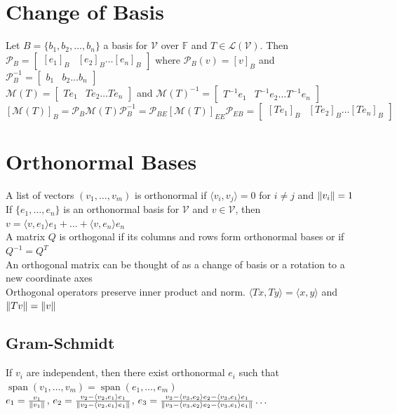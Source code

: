 \documentclass{article}
\DeclarePairedDelimiter\norm{\lVert}{\rVert}%
\DeclareMathOperator{\spans}{span}
\newcommand{\F}{\mathbb{F}}
\newcommand{\linear}{\mathcal{L}}
\newcommand{\PP}{\mathcal{P}}
\newcommand{\M}{\mathcal{M}}
\newcommand{\V}{\mathcal{V}}
\newcommand\inner[2]{\langle #1, #2 \rangle}
\begin{document}
\section{Change of Basis}
Let $B = \{b_1, b_2, ..., b_n\}$ a basis for $\V$ over $\F$ and $T \in \linear(\V)$. Then \\
$\PP_{B} = \begin{bmatrix} [e_1]_B & [e_2]_B  \ldots  [e_n]_B \end{bmatrix}$ where $\PP_{B}(v) = [v]_B$ and $\PP_{B}^{-1} = \begin{bmatrix} b_1 & b_2  \ldots b_n \end{bmatrix}$ \\
$\M(T) = \begin{bmatrix} Te_1 & Te_2  \ldots  Te_n \end{bmatrix}$ and ${\M(T)} ^{-1} = \begin{bmatrix} T^{-1}e_1 & T^{-1}e_2  \ldots  T^{-1}e_n \end{bmatrix}$ \\
$[\M(T)]_B = \PP_B \M(T) \PP_B^{-1} = \PP_{BE}[\M(T)]_{EE}\PP_{EB} =  \begin{bmatrix} [Te_1]_B & [Te_2]_B  \ldots  [Te_n]_B \end{bmatrix}$

\section{Orthonormal Bases}
A list of vectors $(v_1, \ldots, v_m)$ is orthonormal if $\inner {v_i} {v_j} = 0$ for $i \neq j$ and $\norm {v_i} = 1$ \\
If $\{e_1, \ldots, e_n\}$ is an orthonormal basis for $\V$ and $v \in \V$, then $v = \inner{v}{e_1}e_1 + \ldots + \inner{v}{e_n}e_n$ \\
A matrix $Q$ is orthogonal if its columns and rows form orthonormal bases or if $Q^{-1} = Q^T$ \\
An orthogonal matrix can be thought of as a change of basis or a rotation to a new coordinate axes \\
Orthogonal operators preserve inner product and norm. $\inner{Tx}{Ty} = \inner{x}{y}$ and $\norm{Tv} = \norm{v}$

\subsection{Gram-Schmidt}
If $v_i$ are independent, then there exist orthonormal $e_i$ such that $\spans(v_1, \ldots, v_m) = \spans(e_1, \ldots, e_m)$ \\
$e_1 = \frac{v_1}{\norm {v_1}}$, $e_2 = \frac{v_2 - \inner{v_2}{e_1}e_1}{\norm{v_2 - \inner{v_2}{e_1}e_1}}$, $e_3 = \frac{v_3 -  \inner{v_3}{e_2}e_2- \inner{v_3}{e_1}e_1}{\norm{v_3 -  \inner{v_3}{e_2}e_2- \inner{v_3}{e_1}e_1}} \dots$
\end{document}
